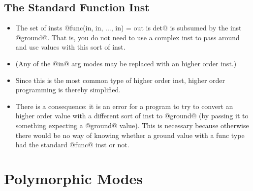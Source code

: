 \subsection{The Standard Function Inst}


\begin{itemize}
\item The set of insts @func(in, in, ..., in) = out is det@ is
  subsumed by the inst @ground@.  That is, you do not need to
  use a complex inst to pass around and use values with this
  sort of inst.
\item (Any of the @in@ arg modes may be replaced with an higher
  order inst.)
\item Since this is the most common type of higher order inst,
  higher order programming is thereby simplified.
\item There is a consequence: it is an error for a program to try
  to convert an higher order value with a different sort of
  inst to @ground@ (\eg by passing it to something expecting a
  @ground@ value).  This is necessary because otherwise there
  would be no way of knowing whether a ground value with a
  func type had the standard @func@ inst or not.
\end{itemize}

\section{Polymorphic Modes}




